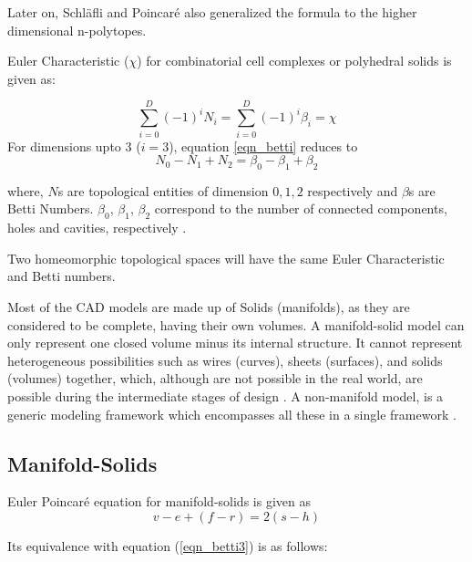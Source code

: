 Later on, Schläfli and Poincar\'e also generalized the formula to the higher dimensional n-polytopes. 

Euler Characteristic ($\chi$) for combinatorial cell complexes or polyhedral solids is given as:

\begin{equation}
\sum_{i=0 }^D(-1)^{i} N_{i}= \sum_{i=0}^D(-1)^{i} \beta_{i} = \chi 
\label{eqn_betti}
\end{equation}
For dimensions upto 3 ($i=3$), equation \ref{eqn_betti} reduces to
\begin{equation}
N_{0}-N_{1}+N_{2}= \beta_{0} -\beta_{1} + \beta_{2}
\label{eqn_betti3}
\end{equation}

where, $N$s are topological entities of dimension $0,1,2$ respectively and $\beta$s are Betti Numbers. $\beta_{0}$, $\beta_{1}$, $\beta_{2}$ correspond to  the number of connected components, holes and cavities, respectively \cite{Sequin}. 

Two homeomorphic topological spaces will have the same Euler Characteristic and Betti numbers.

Most of the CAD models are made up of Solids (manifolds), as they are considered to be complete, having their own volumes. A manifold-solid model  can only represent one closed volume minus its internal structure. It cannot represent  heterogeneous possibilities such as wires (curves),  sheets (surfaces),  and  solids (volumes) together, which, although are not possible in the real world, are possible during the intermediate stages of design \cite{Yamaguchi1995}. A non-manifold model, is a generic modeling framework which encompasses all these in a single framework \cite{Lee2001}.

\subsection{Manifold-Solids}
Euler Poincar\'e equation for manifold-solids is given as 
\begin{equation}
v - e + (f - r) = 2 (s - h)
\label{eqn_manifold}
\end{equation}

Its equivalence with equation (\ref{eqn_betti3}) is as follows:

